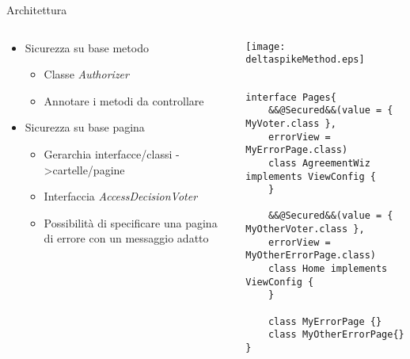 \begin{frame}[fragile]{Architettura}
\begin{columns}[T]
\begin{column}{.5\textwidth}


\begin{itemize}
\item Sicurezza su base metodo

	\begin{itemize}
	\item Classe \textsl{Authorizer}
	\vspace{0.8em}
	\item Annotare i metodi\newline
	da controllare
	\end{itemize}

\vspace{0.8em}
\item Sicurezza su base pagina
	\begin{itemize}
	\item Gerarchia interfacce/classi -\textgreater  cartelle/pagine
	\vspace{0.8em}
	\item Interfaccia \textsl{AccessDecisionVoter}
	\vspace{0.8em}
	\item Possibilità di specificare\newline
	una pagina di errore\newline
	con un messaggio adatto
	\end{itemize}
\end{itemize}
\end{column}

\begin{column}{.5\textwidth}
\vspace{2.6em}
\texttt{[image: deltaspikeMethod.eps]}

\vspace{1.6em}
\begin{lstlisting}[basicstyle={\tiny\ttfamily}]

interface Pages{
    &&@Secured&&(value = { MyVoter.class }, 
    errorView = MyErrorPage.class)
    class AgreementWiz implements ViewConfig {
    }

    &&@Secured&&(value = { MyOtherVoter.class },
    errorView = MyOtherErrorPage.class)
    class Home implements ViewConfig {
    }
    
    class MyErrorPage {}
    class MyOtherErrorPage{}
}
\end{lstlisting}

\end{column}

\end{columns}
\end{frame}

